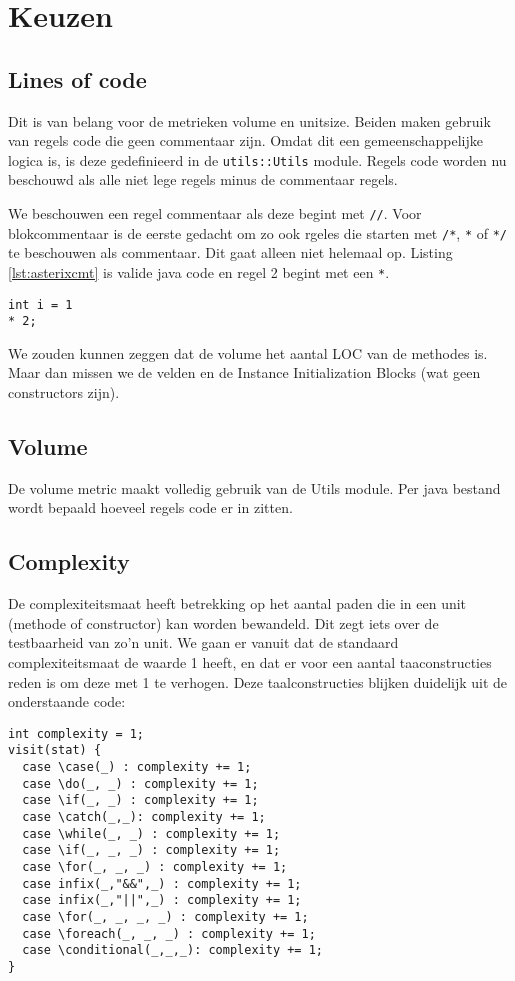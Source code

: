 \documentclass[a4paper]{article}
\begin{document}
\section{Keuzen}
\subsection{Lines of code}
Dit is van belang voor de metrieken volume en unitsize. Beiden maken gebruik van regels code die geen commentaar zijn. Omdat dit een gemeenschappelijke logica is, is deze gedefinieerd in de \texttt{utils::Utils} module.
Regels code worden nu beschouwd als alle niet lege regels minus de commentaar regels.

We beschouwen een regel commentaar als deze begint met \lstinline{//}. Voor blokcommentaar is de eerste gedacht om zo ook rgeles die starten met \lstinline{/*}, \lstinline{*} of \lstinline{*/} te beschouwen als commentaar. Dit gaat alleen niet helemaal op. Listing \ref{lst:asterixcmt} is valide java code en regel 2 begint met een \lstinline{*}.

\begin{lstlisting}[caption={* als commentaar beschouwen},label={lst:asterixcmt},escapechar=|, frame = single]
int i = 1
* 2;
\end{lstlisting}

We zouden kunnen zeggen dat de volume het aantal LOC van de methodes is. Maar dan missen we de velden en de Instance Initialization Blocks (wat geen constructors zijn).

\subsection{Volume}
De volume metric maakt volledig gebruik van de Utils module. Per java bestand wordt bepaald hoeveel regels code er in zitten. 

\subsection{Complexity}
De complexiteitsmaat heeft betrekking op het aantal paden die in een unit (methode of constructor) kan worden bewandeld. Dit zegt iets over de testbaarheid van zo'n unit. We gaan er vanuit dat de standaard complexiteitsmaat de waarde 1 heeft, en dat er voor een aantal taaconstructies reden is om deze met 1 te verhogen. Deze taalconstructies blijken duidelijk uit de onderstaande code:

\begin{lstlisting}[caption={Taalsconstructies die de complexiteit verhogen},label={lst:complexity},escapechar=|, frame = single]
int complexity = 1;
visit(stat) {
  case \case(_) : complexity += 1;
  case \do(_, _) : complexity += 1;
  case \if(_, _) : complexity += 1;
  case \catch(_,_): complexity += 1;
  case \while(_, _) : complexity += 1;
  case \if(_, _, _) : complexity += 1;
  case \for(_, _, _) : complexity += 1;
  case infix(_,"&&",_) : complexity += 1;
  case infix(_,"||",_) : complexity += 1;    
  case \for(_, _, _, _) : complexity += 1;
  case \foreach(_, _, _) : complexity += 1;
  case \conditional(_,_,_): complexity += 1;
}
\end{lstlisting}
\end{document}
